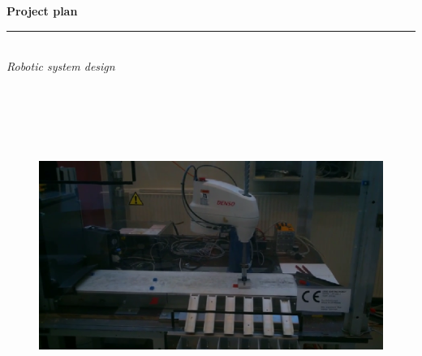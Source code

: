 \thispagestyle{empty}

\begin{minipage}{\textwidth}
\flushright

\begin{flushright}
{\huge\bfseries Project plan}
\end{flushright}

\noindent\rule[-1ex]{\textwidth}{2pt}\\
[2.5ex]
\hfill\emph{\Large Robotic system design}
\end{minipage}
\\
\\
\\
\\
\begin{figure}[ht]
\centering
\includegraphics[width=\textwidth]{images/frontpage.png}
\label{fig:frontpage}
\end{figure}
\@afterindentfalse \@afterheading

\vspace{2cm}
\begin{minipage}{\textwidth}
\flushleft


\end{minipage}

